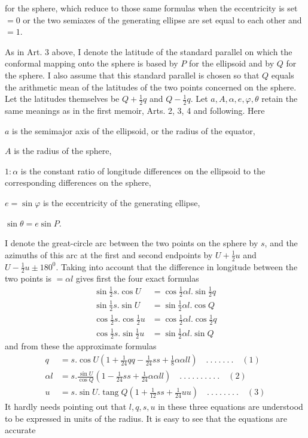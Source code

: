 %
for the sphere, which reduce to those same formulas when the eccentricity is set \(=0\) or the two semiaxes of the generating ellipse are set equal to each other and \(=1\).

As in Art. 3 above, I denote the latitude of the standard parallel on which the conformal mapping onto the sphere is based by \(P\) for the ellipsoid and by \(Q\) for the sphere. I also assume that this standard parallel is chosen so that \(Q\) equals the arithmetic mean of the latitudes of the two points concerned on the sphere. Let the latitudes themselves be \(Q+\frac12q\) and \(Q-\frac12q\). Let \(a,A,\alpha,e,\varphi,\theta\) retain the same meanings as in the first memoir, Arts. 2, 3, 4 and following. Here
\begin{list}{}{\setlength{\leftmargin}{1em}\setlength{\itemindent}{0pt}\setlength{\itemsep}{0pt}\setlength{\parsep}{0pt}}
\item \(a\) is the semimajor axis of the ellipsoid, or the radius of the equator,
\item \(A\) is the radius of the sphere,
\item \(1:\alpha\) is the constant ratio of longitude differences on the ellipsoid to the corresponding differences on the sphere,
\item \(e=\sin\varphi\) is the eccentricity of the generating ellipse,
\item \(\sin\theta=e\sin P\).
\end{list}

\indent I denote the great-circle arc between the two points on the sphere by \(s\), and the azimuths of this arc at the first and second endpoints by \(U+\frac12u\) and \(U-\frac12u\pm180^0\). Taking into account that the difference in longitude between the two points is \(=\alpha l\) gives first the four exact formulas
\[
\begin{aligned}
\sin\tfrac12s\mathord{.}\cos U&=\cos\tfrac12\alpha l\mathord{.}\sin\tfrac12q\\
\sin\tfrac12s\mathord{.}\sin U&=\sin\tfrac12\alpha l\mathord{.}\cos Q\\
\cos\tfrac12s\mathord{.}\cos\tfrac12u&=\cos\tfrac12\alpha l\mathord{.}\cos\tfrac12q\\
\cos\tfrac12s\mathord{.}\sin\tfrac12u&=\sin\tfrac12\alpha l\mathord{.}\sin Q
\end{aligned}
\]
and from these the approximate formulas
\[
\begin{aligned}
q&=s\mathord{.}\cos U(1+\tfrac1{24}qq-\tfrac1{24}ss+\tfrac18\alpha\alpha ll)\quad .\ .\ .\ .\ .\ .\ .\quad(1)\\
\alpha l&=s\mathord{.}\frac{\sin U}{\cos Q}(1-\tfrac1{24}ss+\tfrac1{24}\alpha\alpha ll)\quad .\ .\ .\ .\ .\ .\ .\ .\ .\ .\quad(2)\\
u&=s\mathord{.}\sin U\mathord{.}\operatorname{tang}Q(1+\tfrac1{12}ss+\tfrac1{24}uu)\quad .\ .\ .\ .\ .\ .\ .\ .\quad(3)
\end{aligned}
\]
It hardly needs pointing out that \(l,q,s,u\) in these three equations are understood to be expressed in units of the radius. It is easy to see that the equations are accurate
